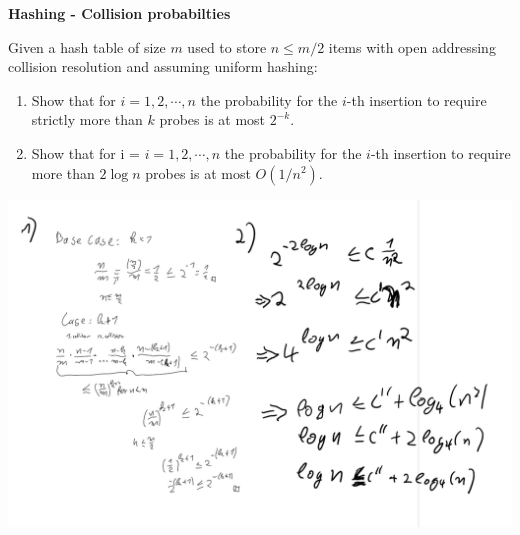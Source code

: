 \question \textbf{Hashing - Collision probabilties}

Given a hash table of size $m$ used to store $n \leq m/2$ items with open addressing collision resolution and assuming uniform hashing:
\begin{enumerate}
\item Show that for $i = 1, 2, \cdots , n$ the probability for the $i$-th insertion to require strictly more than $k$ probes is at most $2^{-k}$.
\item Show that for i = $i = 1, 2, \cdots , n$ the probability for the $i$-th insertion to require more than $2\log n$ probes is at most $O(1/n^2)$.
\end{enumerate}

\includegraphics[width=0.8\linewidth]{task_3/task_3.png}
